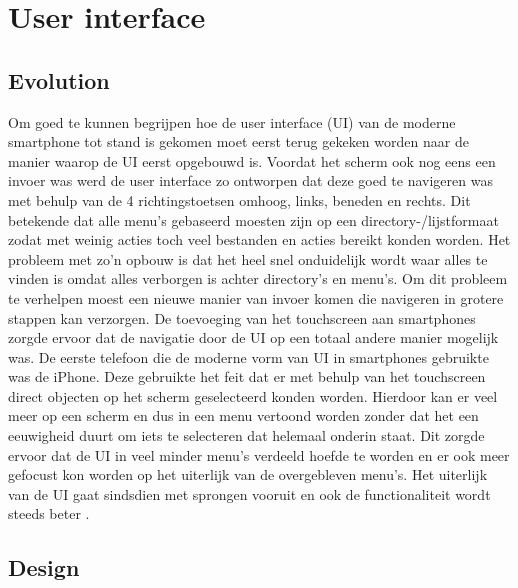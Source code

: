 \chapter{User interface}

\section{Evolution}

Om goed te kunnen begrijpen hoe de user interface (UI) van de moderne smartphone tot stand is gekomen moet eerst terug gekeken worden naar de manier waarop de UI eerst opgebouwd is.
Voordat het scherm ook nog eens een invoer was werd de user interface zo ontworpen dat deze goed te navigeren was met behulp van de 4 richtingstoetsen omhoog, links, beneden en rechts.
Dit betekende dat alle menu's gebaseerd moesten zijn op een directory-/lijstformaat zodat met weinig acties toch veel bestanden en acties bereikt konden worden.
Het probleem met zo'n opbouw is dat het heel snel onduidelijk wordt waar alles te vinden is omdat alles verborgen is achter directory's en menu's.
Om dit probleem te verhelpen moest een nieuwe manier van invoer komen die navigeren in grotere stappen kan verzorgen.
De toevoeging van het touchscreen aan smartphones zorgde ervoor dat de navigatie door de UI op een totaal andere manier mogelijk was.
De eerste telefoon die de moderne vorm van UI in smartphones gebruikte was de iPhone.
Deze gebruikte het feit dat er met behulp van het touchscreen direct objecten op het scherm geselecteerd konden worden.
Hierdoor kan er veel meer op een scherm en dus in een menu vertoond worden zonder dat het een eeuwigheid duurt om iets te selecteren dat helemaal onderin staat.
Dit zorgde ervoor dat de UI in veel minder menu's verdeeld hoefde te worden en er ook meer gefocust kon worden op het uiterlijk van de overgebleven menu's.
Het uiterlijk van de UI gaat sindsdien met sprongen vooruit en ook de functionaliteit wordt steeds beter \citep{simplicityUI}.

\section{Design}

